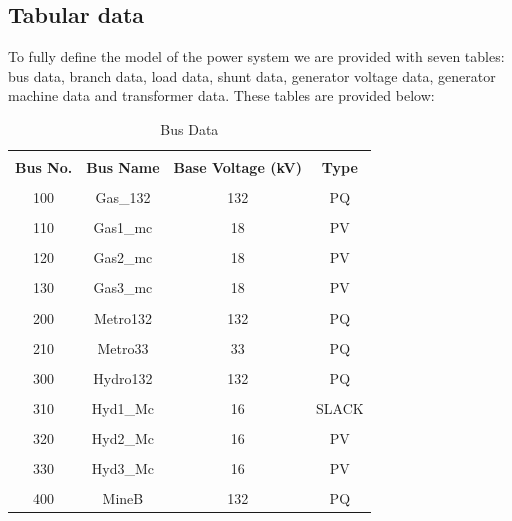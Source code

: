 \documentclass[paper=a4, fontsize=11pt]{article}
\begin{document}
\subsection{Tabular data}
To fully define the model of the power system we are provided with seven tables: bus data, branch data, load data, shunt data, generator voltage data, generator machine data and transformer data. These tables are provided below:

\begin{table}[h]
\caption{Bus Data}
\centering
\begin{tabular}{|c|c|c|c|}
\hline &&&\\[-1em]
\textbf{Bus No.} & \textbf{Bus Name} & \textbf{Base Voltage (kV)} & \textbf{Type} \\ \hline &&&\\[-1em]
100              & Gas\_132          & 132                        & PQ            \\ \hline &&&\\[-1em]
110              & Gas1\_mc          & 18                         & PV            \\ \hline &&&\\[-1em]
120              & Gas2\_mc          & 18                         & PV            \\ \hline &&&\\[-1em]
130              & Gas3\_mc          & 18                         & PV            \\ \hline &&&\\[-1em]
200              & Metro132          & 132                        & PQ            \\ \hline &&&\\[-1em]
210              & Metro33           & 33                         & PQ            \\ \hline &&&\\[-1em]
300              & Hydro132          & 132                        & PQ            \\ \hline &&&\\[-1em]
310              & Hyd1\_Mc          & 16                         & SLACK         \\ \hline &&&\\[-1em]
320              & Hyd2\_Mc          & 16                         & PV            \\ \hline &&&\\[-1em]
330              & Hyd3\_Mc          & 16                         & PV            \\ \hline &&&\\[-1em]
400              & MineB             & 132                        & PQ            \\ \hline
\end{tabular}
\label{table:2}
\end{table}
\end{document}
